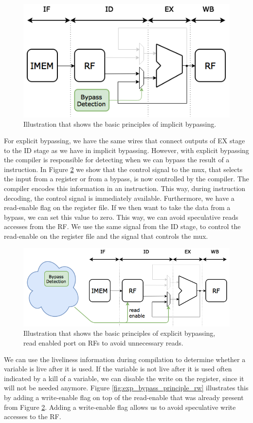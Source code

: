 \begin{figure}[t!]
\centering
\includegraphics[width=.5\textwidth]{figures/impl_bypassing_principle/03_implicit_bypassing_principle}
\caption{Illustration that shows the basic principles of implicit bypassing.}
\label{fig:impl_bypass_principle}
\end{figure}

For explicit bypassing, we have the same wires that connect outputs of EX stage to the ID stage as we have in implicit bypassing. However, with explicit bypassing the compiler is responsible for detecting when we can bypass the result of a instruction. In Figure \ref{fig:exp_bypass_principle_r} we show that the control signal to the mux, that selects the input from a register or from a bypass, is now controlled by the compiler. The compiler encodes this information in an instruction. This way, during instruction decoding, the control signal is immediately available. Furthermore, we have a read-enable flag on the register file. If we then want to take the data from a bypass, we can set this value to zero. This way, we can avoid speculative reads accesses from the RF. We use the same signal from the ID stage, to control the read-enable on the register file and the signal that controls the mux. 

\begin{figure}[H]
\centering
\includegraphics[width=.7\textwidth]{figures/expl_bypassing_principle/01_explicit_bypassing_principle}
\caption{Illustration that shows the basic principles of explicit bypassing, read enabled port on RFs to avoid unnecessary reads.}
\label{fig:exp_bypass_principle_r}
\end{figure}

We can use the liveliness information during compilation to determine whether a variable is live after it is used. If the variable is not live after it is used often indicated by a kill of a variable, we can disable the write on the register, since it will not be needed anymore. Figure \ref{fig:exp_bypass_principle_rw} illustrates this by adding a write-enable flag on top of the read-enable that was already present from Figure \ref{fig:exp_bypass_principle_r}. Adding a write-enable flag allows us to avoid speculative write accesses to the RF.


